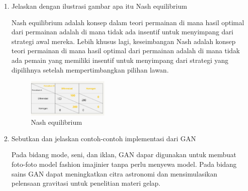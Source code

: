 \begin{enumerate}
            \item Jelaskan dengan ilustrasi gambar apa itu Nash equilibrium
            \par Nash equilibrium adalah konsep dalam teori permainan di mana hasil optimal dari permainan adalah di mana tidak ada insentif untuk menyimpang dari strategi awal mereka. Lebih khusus lagi, keseimbangan Nash adalah konsep teori permainan di mana hasil optimal dari permainan adalah di mana tidak ada pemain yang memiliki insentif untuk menyimpang dari strategi yang dipilihnya setelah mempertimbangkan pilihan lawan.
            \begin{figure}[H]
                \includegraphics[width=4cm]{figures/1174039/chapter8/teori7.jpg}
                \centering
                  \caption{Nash equilibrium}
            \end{figure}

            \item Sebutkan dan jelaskan contoh-contoh implementasi dari GAN
            \par Pada bidang mode, seni, dan iklan, GAN dapar digunakan untuk membuat foto-foto model fashion imajinier tanpa perlu menyewa model. Pada bidang sains GAN dapat meningkatkan citra astronomi dan mensimulasikan pelensaan gravitasi untuk penelitian materi gelap.


\end{enumerate}
